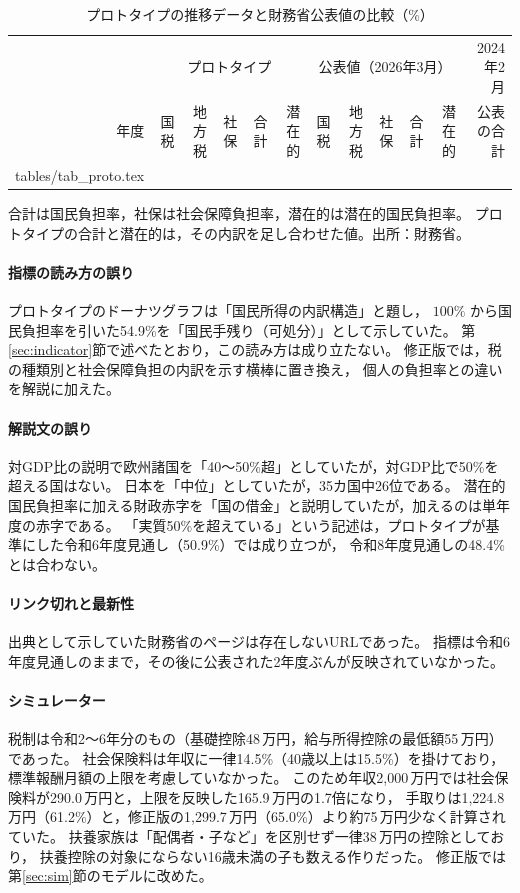 \documentclass[paper=a4,fontsize=10pt]{jlreq}
\makeatletter
\newcommand{\tabinput}[1]{\@@input #1 }
\newcommand{\man}{\,万円}
\makeatother
\begin{document}
\begin{table}[htbp]
  \centering
  \caption{プロトタイプの推移データと財務省公表値の比較（\%）}\label{tab:proto}
  {\footnotesize
  \begin{tabular}{r|rrrrr|rrrrr|r}
    \toprule
    & \multicolumn{5}{c|}{プロトタイプ} & \multicolumn{5}{c|}{公表値（2026年3月）} & 2024年2月 \\
    年度 & 国税 & 地方税 & 社保 & 合計 & 潜在的 & 国税 & 地方税 & 社保 & 合計 & 潜在的 & 公表の合計 \\
    \midrule
    \tabinput{tables/tab_proto.tex}
    \bottomrule
  \end{tabular}}

  \smallskip
  {\footnotesize 合計は国民負担率，社保は社会保障負担率，潜在的は潜在的国民負担率。
  プロトタイプの合計と潜在的は，その内訳を足し合わせた値。出所：財務省\cite{mof2026,mof2024}。}
\end{table}

\paragraph{指標の読み方の誤り}
プロトタイプのドーナツグラフは「国民所得の内訳構造」と題し，
$100\%$ から国民負担率を引いた54.9\%を「国民手残り（可処分）」として示していた。
第\ref{sec:indicator}節で述べたとおり，この読み方は成り立たない。
修正版では，税の種類別と社会保障負担の内訳を示す横棒に置き換え，
個人の負担率との違いを解説に加えた。

\paragraph{解説文の誤り}
対GDP比の説明で欧州諸国を「40〜50\%超」としていたが，対GDP比で50\%を超える国はない。
日本を「中位」としていたが，35カ国中26位である。
潜在的国民負担率に加える財政赤字を「国の借金」と説明していたが，加えるのは単年度の赤字である。
「実質50\%を超えている」という記述は，プロトタイプが基準にした令和6年度見通し（50.9\%）では成り立つが，
令和8年度見通しの48.4\%とは合わない。

\paragraph{リンク切れと最新性}
出典として示していた財務省のページは存在しないURLであった。
指標は令和6年度見通しのままで，その後に公表された2年度ぶんが反映されていなかった。

\paragraph{シミュレーター}
税制は令和2〜6年分のもの（基礎控除48\man，給与所得控除の最低額55\man）であった。
社会保険料は年収に一律14.5\%（40歳以上は15.5\%）を掛けており，標準報酬月額の上限を考慮していなかった。
このため年収2,000\man では社会保険料が290.0\man と，上限を反映した165.9\man の1.7倍になり，
手取りは1,224.8\man（61.2\%）と，修正版の1,299.7\man（65.0\%）より約75\man 少なく計算されていた。
扶養家族は「配偶者・子など」を区別せず一律38\man の控除としており，
扶養控除の対象にならない16歳未満の子も数える作りだった。
修正版では第\ref{sec:sim}節のモデルに改めた。
\end{document}
